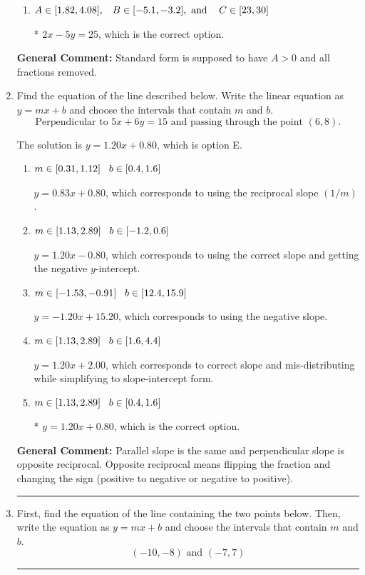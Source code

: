 \documentclass{extbook}[14pt]
\newcommand{\litem}[1]{\item #1

\rule{\textwidth}{0.4pt}}
\begin{document}
\begin{enumerate}
{\begin{enumerate}[label=\Alph*.]
 $-0.4x - 1y = 5.0$, which corresponds to using the opposite (negative) slope of the graph and not removing rational values.
\item \( A \in [1.82, 4.08], \hspace{3mm} B \in [-5.1, -3.2], \text{ and } \hspace{3mm} C \in [23, 30] \)

* $2x - 5y = 25$, which is the correct option.
\end{enumerate}

\textbf{General Comment:} Standard form is supposed to have $A > 0$ and all fractions removed.
}
\litem{
Find the equation of the line described below. Write the linear equation as $ y=mx+b $ and choose the intervals that contain $m$ and $b$.
\[ \text{Perpendicular to } 5 x + 6 y = 15 \text{ and passing through the point } (6, 8). \]

The solution is \( y = 1.20x + 0.80 \), which is option E.\begin{enumerate}[label=\Alph*.]
\item \( m \in [0.31, 1.12] \hspace*{3mm} b \in [0.4, 1.6] \)

 $y = 0.83x + 0.80$, which corresponds to using the reciprocal slope $(1/m)$.
\item \( m \in [1.13, 2.89] \hspace*{3mm} b \in [-1.2, 0.6] \)

 $y = 1.20x - 0.80$, which corresponds to using the correct slope and getting the negative $y$-intercept.
\item \( m \in [-1.53, -0.91] \hspace*{3mm} b \in [12.4, 15.9] \)

 $y = -1.20x + 15.20$, which corresponds to using the negative slope.
\item \( m \in [1.13, 2.89] \hspace*{3mm} b \in [1.6, 4.4] \)

 $y = 1.20x + 2.00$, which corresponds to correct slope and mis-distributing while simplifying to slope-intercept form.
\item \( m \in [1.13, 2.89] \hspace*{3mm} b \in [0.4, 1.6] \)

* $y = 1.20x + 0.80$, which is the correct option.
\end{enumerate}

\textbf{General Comment:} Parallel slope is the same and perpendicular slope is opposite reciprocal. Opposite reciprocal means flipping the fraction and changing the sign (positive to negative or negative to positive).
}
\litem{
First, find the equation of the line containing the two points below. Then, write the equation as $ y=mx+b $ and choose the intervals that contain $m$ and $b$.
\[ (-10, -8) \text{ and } (-7, 7) \]

}
\end{enumerate}
\end{document}
